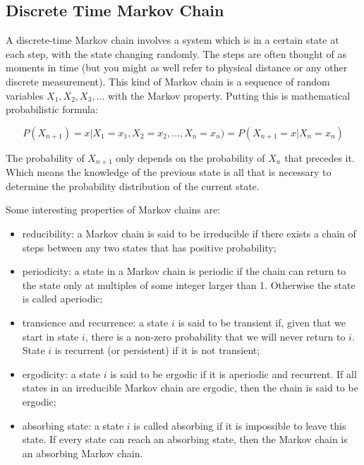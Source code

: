 
\subsection{Discrete Time Markov Chain}
A discrete-time Markov chain involves a system which is in a certain state at each step, with the state changing randomly. The steps are often thought of as moments in time (but you might as well refer to physical distance or any other discrete measurement). This kind of Markov chain is a sequence of random variables $X_1, X_2, X_3,\ldots$ with the Markov property. Putting this is mathematical probabilistic formula:

\begin{equation}
P(X_{n+1}) = x | X_1 = x_1, X_2 = x_2, \ldots, X_n = x_n) = P( X_{n+1} = x | X_n = x_n)
\end{equation}

The probability of $X_{n+1}$ only depends on the probability of $X_n$ that precedes it. Which means the knowledge of the previous state is all that is necessary to determine the probability distribution of the current state.

\begin{attention}
Some interesting properties of Markov chains are:

\begin{itemize}
\tightlist
\item reducibility: a Markov chain is said to be irreducible if there exists a chain of steps between any two states that has positive probability;
\item periodicity: a state in a Markov chain is periodic if the chain can return to the state only at multiples of some integer larger than 1. Otherwise the state is called aperiodic;	
\item transience and recurrence: a state $i$ is said to be transient if, given that we start in state $i$, there is a non-zero probability that we will never return to $i$. State $i$ is recurrent (or persistent) if it is not transient;
\item ergodicity: a state $i$ is said to be ergodic if it is aperiodic and recurrent. If all states in an irreducible Markov chain are ergodic, then the chain is said to be ergodic;
\item absorbing state: a state $i$ is called absorbing if it is impossible to leave this state. If every state can reach an absorbing state, then the Markov chain is an absorbing Markov chain.
\end{itemize}
\end{attention}

